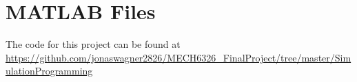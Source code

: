 \documentclass[letterpaper, 10 pt, conference]{ieeeconf}
\begin{document}
{}


\appendix
\section{MATLAB Files}
\label{apx:matlab}
The code for this project can be found at 
\url{https://github.com/jonaswagner2826/MECH6326_FinalProject/tree/master/SimulationProgramming}
\end{document}
